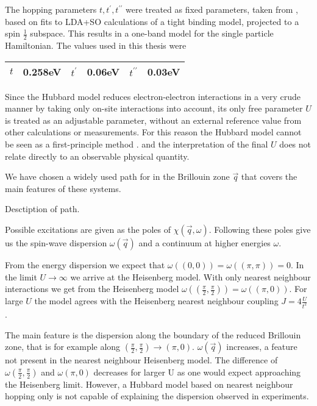\documentclass[a4paper,10pt]{report}
\begin{document}
The hopping parameters $t,t^{\prime},t^{\prime \prime}$ were treated as fixed parameters, taken from 
\cite{PhysRevLett.106.136402}, based on fits to LDA+SO calculations of a tight binding model, projected to a spin $\frac12$ subspace. 
This results in a one-band model for the single particle Hamiltonian.
The values used in this thesis were \newline
\begin{tabular}{|r@{=}l|r@{=}l|r@{=}l|}
\hline
$t$ & 0.258eV &
$t^{\prime}$ & 0.06eV &
$t^{\prime \prime}$ & 0.03eV \\
\hline
\end{tabular}
\newline




Since the Hubbard model reduces electron-electron interactions in a very crude manner by taking only on-site interactions into account,
its only free parameter $U$ is treated as an adjustable parameter, without an external reference value from other calculations or measurements.	
For this reason the Hubbard model cannot be seen as a first-principle method \cite{J.Phys.Cond.Matter.Vol21.34}.
and the interpretation of the final $U$ does not relate directly to an observable physical quantity.

We have chosen a widely used path for in the Brillouin zone $\vec q$ that covers the main features of these systems.

Desctiption of path. 

Possible excitations are given as the poles of $\chi(\vec q,\omega)$. 
Following these poles give us the spin-wave dispersion $\omega(\vec q)$ and a continuum at higher energies $\omega$.

From the energy dispersion  we expect that $\omega( (0,0) ) = \omega(( \pi,\pi )) = 0$.
In the limit $U\rightarrow \infty$ we arrive at the Heisenberg model. 
With only nearest neighbour interactions we get from the Heisenberg model
$\omega( (\frac{\pi}{2}, \frac{\pi}2 )) = \omega(( \pi,0))$.
For large $U$ the model agrees with the Heisenberg nearest neighbour coupling $J=4\frac{U}{t^2}$ .

The main feature is the dispersion along the boundary of the reduced Brillouin zone, that is for example along $(\frac{\pi}2,\frac{\pi}2) \rightarrow (\pi,0)$.
$\omega(\vec q)$ increases, a feature not present in the nearest neighbour Heisenberg model. 
The difference of $\omega(\frac{\pi}2,\frac{\pi}2)$ and $\omega(\pi,0)$ decreases for larger U as one would expect approaching the Heisenberg limit.
However, a Hubbard model based on nearest neighbour hopping only is not capable of explaining the dispersion observed in experiments.
\end{document}
